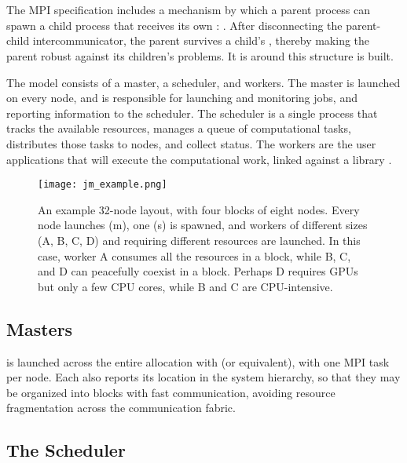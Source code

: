 \section{\mpijm}

The MPI specification\cite{MPI} includes a mechanism by which a parent process can spawn a child process that receives its own \mpicommworld: \spawn.
After disconnecting the parent-child intercommunicator, the parent survives a child's \mpiabort, thereby making the parent robust against its children's problems.
It is around this structure \mpijm is built.

The \mpijm model consists of a master, a scheduler, and workers.
The master \jmmaster is launched on every node, and is responsible for launching and monitoring jobs, and reporting information to the scheduler.
The scheduler \jmscheduler is a single process that tracks the available resources, manages a queue of computational tasks, distributes those tasks to nodes, and collect status.
The workers are the user applications that will execute the computational work, linked against a library \jmworker.

\begin{figure}[t]
    \centering
        \texttt{[image: jm\_example.png]}
    \caption{An example 32-node layout, with four blocks of eight nodes.  Every node launches \jmmaster (m), one \jmscheduler (s) is spawned, and workers of different sizes (A, B, C, D) and requiring different resources are launched.  In this case, worker A consumes all the resources in a block, while B, C, and D can peacefully coexist in a block.  Perhaps D requires GPUs but only a few CPU cores, while B and C are CPU-intensive.}
    \label{fig:jm_example}
\end{figure}

\subsection{Masters}

\jmmaster is launched across the entire allocation with \mpirun (or equivalent), with one MPI task per node.
Each \jmmaster also reports its location in the system hierarchy, so that they may be organized into blocks with fast communication, avoiding resource fragmentation across the communication fabric.

\subsection{The Scheduler}


